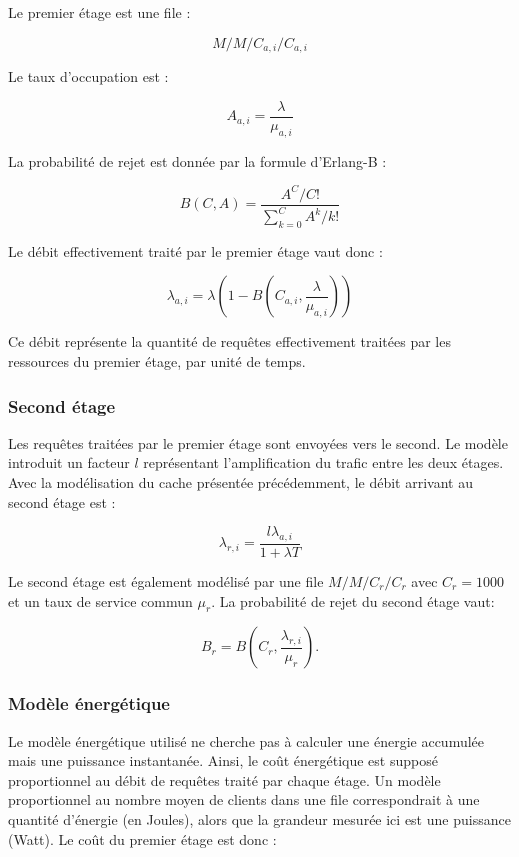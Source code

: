 \documentclass[12pt, a4paper]{report}
\begin{document}
	\noindent Le premier étage est une file :

	\[
	M/M/C_{a,i}/C_{a,i}
	\]


	\noindent Le taux d'occupation est :

	\[
	A_{a,i}=\frac{\lambda}{\mu_{a,i}}
	\]


	\noindent La probabilité de rejet est donnée par la formule d'Erlang-B :


	\[
	B(C,A)=
	\frac{A^C/C!}
	{\displaystyle\sum_{k=0}^{C}A^k/k!}
	\]


	\noindent Le débit effectivement traité par le premier étage vaut donc :

	\[
	\lambda_{a,i}
	=
	\lambda
	\left(
	1-
	B
	\left(
	C_{a,i},
	\frac{\lambda}{\mu_{a,i}}
	\right)
	\right)
	\]


	\noindent Ce débit représente la quantité de requêtes effectivement traitées
	par les ressources du premier étage, par unité de temps.


	\subsubsection{Second étage}


	\noindent Les requêtes traitées par le premier étage sont envoyées vers le second.
	Le modèle introduit un facteur $l$ représentant l'amplification du
	trafic entre les deux étages.
	Avec la modélisation du cache présentée précédemment, le débit arrivant
	au second étage est :

	\[
	\lambda_{r,i}
	=
	\frac{
	l\lambda_{a,i}
	}
	{1+\lambda T}
	\]


	\noindent Le second étage est également modélisé par une file $M/M/C_r/C_r$ avec $C_r=1000$ et un taux de service commun $\mu_r$. La probabilité de rejet du second étage vaut:

	\[
	B_r=
	B
	\left(
	C_r,
	\frac{\lambda_{r,i}}{\mu_r}
	\right).
	\]


	\subsubsection{Modèle énergétique}


	\noindent Le modèle énergétique utilisé ne cherche pas à calculer une énergie
	accumulée mais une puissance instantanée.
	Ainsi, le coût énergétique est supposé proportionnel au débit de
	requêtes traité par chaque étage. Un modèle proportionnel au nombre moyen de clients dans une file correspondrait à une quantité d'énergie (en Joules), alors que la grandeur mesurée
	ici est une puissance (Watt). Le coût du premier étage est donc :
\end{document}

